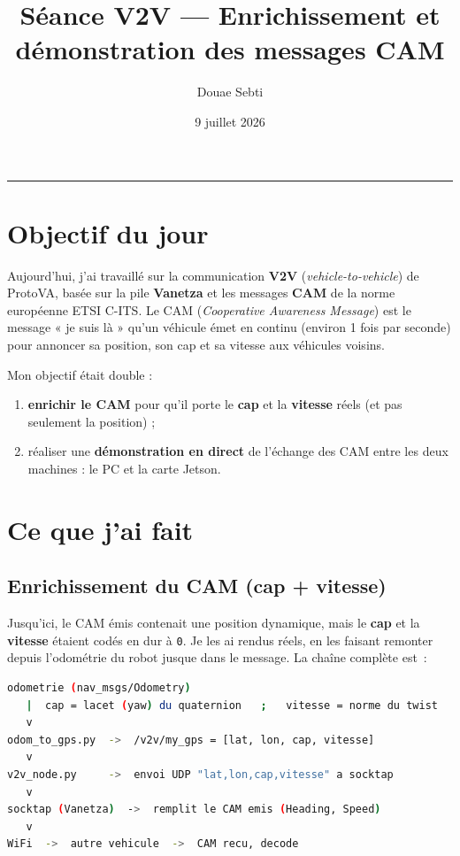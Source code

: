 \documentclass[a4paper,11pt]{article}
\title{\textbf{Séance V2V --- Enrichissement et démonstration des messages CAM}}
\author{Douae Sebti}
\date{9 juillet 2026}
\newcommand{\code}[1]{\texttt{#1}}
\begin{document}
\maketitle
\vspace{-8pt}\hrule\vspace{10pt}

\section{Objectif du jour}
Aujourd'hui, j'ai travaillé sur la communication \textbf{V2V} (\emph{vehicle-to-vehicle})
de ProtoVA, basée sur la pile \textbf{Vanetza} et les messages \textbf{CAM} de la norme
européenne ETSI C-ITS. Le CAM (\emph{Cooperative Awareness Message}) est le message
« je suis là » qu'un véhicule émet en continu (environ 1 fois par seconde) pour annoncer
sa position, son cap et sa vitesse aux véhicules voisins.

Mon objectif était double :
\begin{enumerate}[leftmargin=1.6em]
  \item \textbf{enrichir le CAM} pour qu'il porte le \textbf{cap} et la \textbf{vitesse}
        réels (et pas seulement la position) ;
  \item réaliser une \textbf{démonstration en direct} de l'échange des CAM entre les deux
        machines : le PC et la carte Jetson.
\end{enumerate}

\section{Ce que j'ai fait}

\subsection{Enrichissement du CAM (cap + vitesse)}
Jusqu'ici, le CAM émis contenait une position dynamique, mais le \textbf{cap} et la
\textbf{vitesse} étaient codés en dur à \code{0}. Je les ai rendus réels, en les faisant
remonter depuis l'odométrie du robot jusque dans le message. La chaîne complète est~:

\begin{lstlisting}[language=bash]
odometrie (nav_msgs/Odometry)
   |  cap = lacet (yaw) du quaternion   ;   vitesse = norme du twist
   v
odom_to_gps.py  ->  /v2v/my_gps = [lat, lon, cap, vitesse]
   v
v2v_node.py     ->  envoi UDP "lat,lon,cap,vitesse" a socktap
   v
socktap (Vanetza)  ->  remplit le CAM emis (Heading, Speed)
   v
WiFi  ->  autre vehicule  ->  CAM recu, decode
\end{lstlisting}
\end{document}
